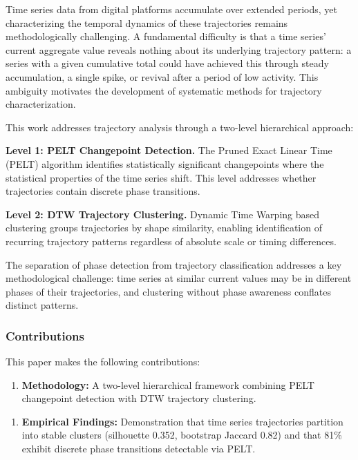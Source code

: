 
Time series data from digital platforms accumulate over extended periods, yet characterizing the temporal dynamics of these trajectories remains methodologically challenging. A fundamental difficulty is that a time series' current aggregate value reveals nothing about its underlying trajectory pattern: a series with a given cumulative total could have achieved this through steady accumulation, a single spike, or revival after a period of low activity. This ambiguity motivates the development of systematic methods for trajectory characterization.

This work addresses trajectory analysis through a two-level hierarchical approach:

\textbf{Level 1: PELT Changepoint Detection.} The Pruned Exact Linear Time (PELT) algorithm identifies statistically significant changepoints where the statistical properties of the time series shift. This level addresses whether trajectories contain discrete phase transitions.

\textbf{Level 2: DTW Trajectory Clustering.} Dynamic Time Warping based clustering groups trajectories by shape similarity, enabling identification of recurring trajectory patterns regardless of absolute scale or timing differences.

The separation of phase detection from trajectory classification addresses a key methodological challenge: time series at similar current values may be in different phases of their trajectories, and clustering without phase awareness conflates distinct patterns.

\subsubsection{Contributions}

This paper makes the following contributions:

\begin{enumerate}
\item \textbf{Methodology:} A two-level hierarchical framework combining PELT changepoint detection with DTW trajectory clustering.
\end{enumerate}

\begin{enumerate}
\item \textbf{Empirical Findings:} Demonstration that time series trajectories partition into stable clusters (silhouette 0.352, bootstrap Jaccard 0.82) and that 81\% exhibit discrete phase transitions detectable via PELT.
\end{enumerate}

